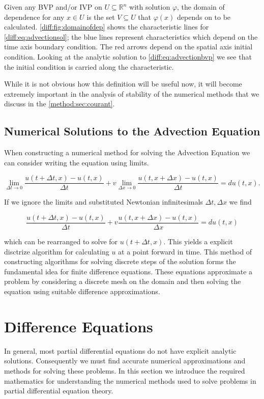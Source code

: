 \documentclass[../main.tex]{subfiles}
\begin{document}
  Given any BVP and/or IVP on $U \subseteq \mathbb{R}^n$ with solution $\varphi$, the domain of dependence for any $x \in U$ is the set $V \subseteq U$ that $\varphi(x)$ depends on to be calculated. \autoref{diff:fig:domainofdep} shows the characteristic lines for \autoref{diff:eq:advectionsol}; the blue lines represent characteristics which depend on the time axis boundary condition. The red arrows depend on the spatial axis initial condition. Looking at the analytic solution to \autoref{diff:eq:advectionbvp} we see that the initial condition is carried along the characteristic.

  While it is not obvious how this definition will be useful now, it will become extremely important in the analysis of stability of the numerical methods that we discuss in the \autoref{method:sec:courant}.

  \subsection{Numerical Solutions to the Advection Equation} \label{diff:sec:fdesintro}
  When constructing a numerical method for solving the Advection Equation we can consider writing the equation using limits.

  \begin{equation} \label{diff:eq:finiteadvection}
    \lim_{\Delta t \to 0} \frac{u(t + \Delta t, x) - u(t, x)}{\Delta t} + v \lim_{\Delta x \to 0} \frac{u(t, x + \Delta x) - u(t, x)}{\Delta t} = d u(t, x).
  \end{equation}

  If we ignore the limits and substituted Newtonian infinitesimals $\Delta t, \Delta x$ we find

  \begin{equation} \label{diff:eq:advectionfde}
    \frac{u(t + \Delta t, x) - u(t, x)}{\Delta t} + v \frac{u(t, x + \Delta x) - u(t, x)}{\Delta x} = d u(t, x)
  \end{equation}

  which can be rearranged to solve for $u(t + \Delta t, x)$. This yields a explicit disctrize algorithm for calculating $u$ at a point forward in time. This method of constructing algorithms for solving discrete steps of the solution forms the fundamental idea for finite difference equations. These equations approximate a problem by considering a discrete mesh on the domain and then solving the equation using suitable difference approximations.

  \section{Difference Equations}
  In general, most partial differential equations do not have explicit analytic solutions. Consequently we must find accurate numerical approximations and methods for solving these problems. In this section we introduce the required mathematics for understanding the numerical methods used to solve problems in partial differential equation theory.
\end{document}
